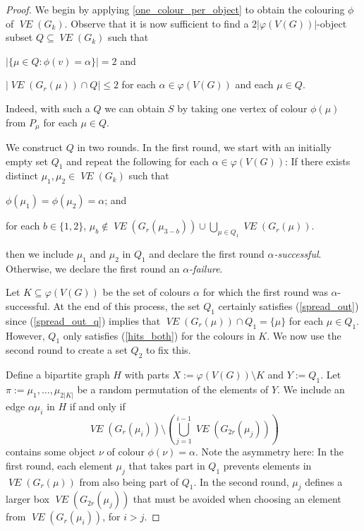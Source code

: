 \documentclass{patmorin}
\newcommand{\defin}[1]{\emph{\color{brown}#1}}
\DeclareMathOperator{\VE}{\mathit{VE}}
\begin{document}
\begin{proof}
  We begin by applying \cref{one_colour_per_object} to obtain the colouring $\phi$ of $\VE(G_k)$.  Observe that it is now sufficient to find a $2|\varphi(V(G))|$-object subset $Q\subseteq\VE(G_k)$ such that 
  \begin{compactenum}[(i)]
    \item $|\{\mu\in Q:\phi(v)=\alpha\}|= 2$ and 
    \item $|\VE(G_r(\mu))\cap Q|\le 2$ for each $\alpha\in\varphi(V(G))$ and each $\mu\in Q$.  
  \end{compactenum}
  Indeed, with such a $Q$ we can obtain $S$ by taking one vertex of colour $\phi(\mu)$ from $P_\mu$ for each $\mu\in Q$.

  We construct $Q$ in two rounds.  In the first round, we start with an initially empty set $Q_1$ and repeat the following for each $\alpha\in\varphi(V(G))$:
  If there exists distinct $\mu_1,\mu_2\in\VE(G_k)$ such that
  \begin{compactenum}[(a)]
    \item $\phi(\mu_1)=\phi(\mu_2)=\alpha$; and\label{hits_both_q}
    \item for each $b\in\{1,2\}$, $\mu_b\not\in \VE(G_r(\mu_{3-b})) \cup \bigcup_{\mu\in Q_1} \VE(G_r(\mu))$.\label{spread_out_q} 
  \end{compactenum}
  then we include $\mu_1$ and $\mu_2$ in $Q_1$ and declare the first round \defin{$\alpha$-successful}.  Otherwise, we declare the first round an \defin{$\alpha$-failure}.

  Let $K\subseteq\varphi(V(G))$ be the set of colours $\alpha$ for which the first round was $\alpha$-successful. At the end of this process, the set $Q_1$ certainly satisfies (\ref{spread_out}) since (\ref{spread_out_q}) implies that $\VE(G_r(\mu))\cap Q_1=\{\mu\}$ for each $\mu\in Q_1$.  However, $Q_1$ only satisfies (\ref{hits_both}) for the colours in $K$.  We now use the second round to create a set $Q_2$ to fix this. 

  Define a bipartite graph $H$ with parts $X:=\varphi(V(G))\setminus K$ and $Y:=Q_1$.  Let $\pi:=\mu_1,\ldots,\mu_{2|K|}$ be a random permutation of the elements of $Y$.  We include an edge $\alpha\mu_i$ in $H$ if and only if
  \[
    \VE(G_r(\mu_i))\setminus\left(\bigcup_{j=1}^{i-1}\VE(G_{2r}(\mu_j))\right)
  \]
  contains some object $\nu$ of colour $\phi(\nu)=\alpha$.  Note the asymmetry here: In the first round, each element $\mu_j$ that takes part in $Q_1$ prevents elements in $\VE(G_r(\mu))$ from also being part of $Q_1$.  In the second round, $\mu_j$ defines a larger box $\VE(G_{2r}(\mu_j))$ that must be avoided when choosing an element from $\VE(G_r(\mu_i))$, for $i>j$.
    

\end{proof}
\end{document}
